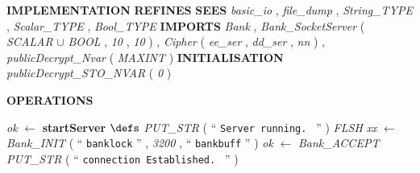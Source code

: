 %
\bsetindent
\begin{tabbing}
\bSetTabs
%
%
\bbnl
{\bf IMPLEMENTATION} \bhsp{} \-\label{ServeBankI}
%
%
\bbnl
{\bf REFINES} \label{ServeBank}
%
%
\bbnl
{\bf SEES} \+ \bbnl
{\em basic\_io\/}\label{basic_io}  , \bnl
{\em file\_dump\/}\label{file_dump}  , \bnl
{\em String\_TYPE\/}\label{String_TYPE}  , \bnl
{\em Scalar\_TYPE\/}\label{Scalar_TYPE}  , \bnl
{\em Bool\_TYPE\/}\label{Bool_TYPE}  \-
%
%
\bbnl
{\bf IMPORTS} \+ \bbnl
{\em Bank\/}\label{Bank}  , \bnl
{\em Bank\_SocketServer\/}\label{Bank_SocketServer}  ( {\em SCALAR\/}\label{SCALAR}  $\cup$ {\em BOOL\/}\label{BOOL}  , {\em 10\/} , {\em 10\/} )  , \bnl
{\em Cipher\/}\label{Cipher}  ( {\em ee\_ser\/}\label{ee_ser}  , {\em dd\_ser\/}\label{dd_ser}  , {\em nn\/}\label{nn}  )  , \bnl
{\em publicDecrypt\_Nvar\/}\label{publicDecrypt_Nvar}  ( {\em MAXINT\/}\label{MAXINT}  )  \-
%
%
\bbnl
{\bf INITIALISATION} \+ \bbnl
{\em publicDecrypt\_STO\_NVAR\/}\label{publicDecrypt_STO_NVAR}  ( {\em 0\/} )
\end{tabbing}
\bresetindent
%
%
\vspace{-4.5ex}\bsetindent
\begin{tabbing}
\bSetTabs
\+\> \-
%
%
\bnl\bnl
{\bf OPERATIONS} \+ \bbnl

%
%
{\em ok\/} $\longleftarrow$  {\bf { startServer}}  \bhsp $\defs$ \+ \bnl
  \+\bnl
{}  \- \bhsp {} \+\bnl
{\em PUT\_STR\/}\label{PUT_STR}  (  `` {\tt Server running.
} ''  )  \bStatementSemiColon \bnl
{\em FLSH\/}\label{FLSH}  \bStatementSemiColon \bnl
{\em xx\/} $\longleftarrow$ {\em Bank\_INIT\/}\label{Bank_INIT}  (  `` {\tt banklock} ''  , {\em 3200\/} ,  `` {\tt bankbuff} ''  )  \bStatementSemiColon \bnl
{\em ok\/} $\longleftarrow$ {\em Bank\_ACCEPT\/}\label{Bank_ACCEPT}  \bStatementSemiColon \bnl
{\em PUT\_STR\/}\label{PUT_STR}  (  `` {\tt connection Established.
} ''  )  \-\bnl
{}  \-\bnl
{}  \- \bOperationSemiColon 
\end{tabbing}
